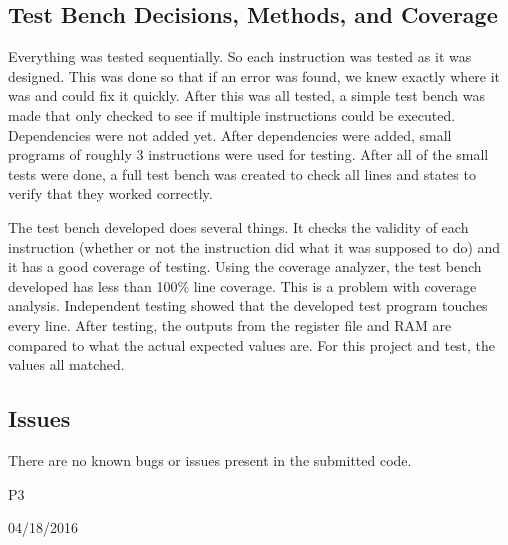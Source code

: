 \documentclass[conference]{IEEEtran}
\begin{document}
\subsection{Test Bench Decisions, Methods, and Coverage}
Everything was tested sequentially. So each instruction was tested as it was designed. This was done so that if an error was found, we knew exactly where it was and could fix it quickly. After this was all tested, a simple test bench was made that only checked to see if multiple instructions could be executed. Dependencies were not added yet. After dependencies were added, small programs of roughly 3 instructions were used for testing. After all of the small tests were done, a full test bench was created to check all lines and states to verify that they worked correctly. 

The test bench developed does several things. 
It checks the validity of each instruction (whether or not the instruction did what it was supposed to do) and it has a good coverage of testing. 
Using the coverage analyzer, the test bench developed has less than 100\% line coverage.
This is a problem with coverage analysis.
Independent testing showed that the developed test program touches every line.
After testing, the outputs from the register file and RAM are compared to what the actual expected values are.
For this project and test, the values all matched.


\subsection{Issues}
There are no known bugs or issues present in the submitted code.

\hfill P3
 
\hfill 04/18/2016
\end{document}
